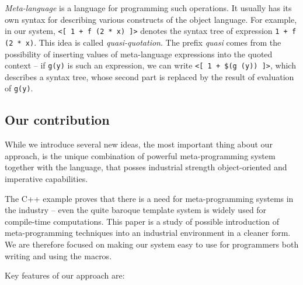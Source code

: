 \documentclass{llncs}
\begin{document}
\emph{Meta-language} is a language for programming such operations. It 
usually has its own syntax for describing various constructs of the object language.
For example, in our system, \verb,<[ 1 + f (2 * x) ]>, denotes the syntax 
tree of expression \verb,1 + f (2 * x),. This idea is called \emph{quasi-quotation}. 
The prefix \emph{quasi} comes from the possibility of inserting values 
of meta-language expressions into the quoted context -- if \verb,g(y), is such 
an expression, we can write \verb.<[ 1 + $(g (y)) ]>., %
which describes a syntax tree, whose second part is replaced by the result of 
evaluation of \verb,g(y),.

\subsection{Our contribution}
While we introduce several new ideas, the most important thing about
our approach, is the unique combination of powerful meta-programming
system together with the language, that posses industrial strength
object-oriented and imperative capabilities.

The C++ example proves that there is a need for meta-programming
systems in the industry -- even the quite baroque template system is
widely used for compile-time computations. This paper is a study of
possible introduction of meta-programming techniques into an industrial
environment in a cleaner form. We are therefore focused on making our
system easy to use for programmers both writing and using the macros.

Key features of our approach are:
\end{document}
